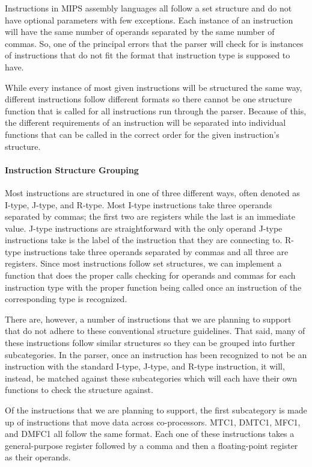 \documentclass[
    parskip=half,
    fontsize=12pt,
    titlepage=firstiscover,
    toc=bibliography,
    numbers=endperiod
]{scrartcl}
\begin{document}
Instructions in MIPS assembly languages all follow a set structure and
do not have optional parameters with few exceptions. Each instance of an
instruction will have the same number of operands separated by the same
number of commas. So, one of the principal errors that the parser will
check for is instances of instructions that do not fit the format that
instruction type is supposed to have.

While every instance of most given instructions will be structured the
same way, different instructions follow different formats so there
cannot be one structure function that is called for all instructions run
through the parser. Because of this, the different requirements of an
instruction will be separated into individual functions that can be
called in the correct order for the given instruction's structure.

\paragraph{Instruction Structure Grouping}

Most instructions are structured in one of three different ways, often
denoted as I-type, J-type, and R-type. Most I-type instructions take
three operands separated by commas; the first two are registers while
the last is an immediate value. J-type instructions are straightforward
with the only operand J-type instructions take is the label of the
instruction that they are connecting to. R-type instructions take three
operands separated by commas and all three are registers. Since most
instructions follow set structures, we can implement a function that
does the proper calls checking for operands and commas for each
instruction type with the proper function being called once an
instruction of the corresponding type is recognized.

There are, however, a number of instructions that we are planning to
support that do not adhere to these conventional structure guidelines.
That said, many of these instructions follow similar structures so they
can be grouped into further subcategories. In the parser, once an
instruction has been recognized to not be an instruction with the
standard I-type, J-type, and R-type instruction, it will, instead, be
matched against these subcategories which will each have their own
functions to check the structure against.

Of the instructions that we are planning to support, the first
subcategory is made up of instructions that move data across
co-processors. MTC1, DMTC1, MFC1, and DMFC1 all follow the same format.
Each one of these instructions takes a general-purpose register followed
by a comma and then a floating-point register as their operands.
\end{document}
